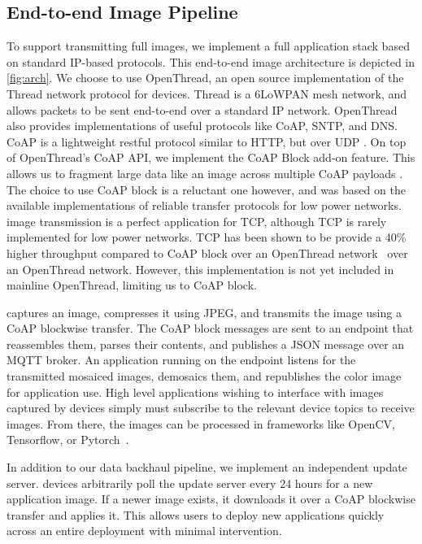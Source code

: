 \subsection{End-to-end Image Pipeline}
To support transmitting full images, we implement a full application stack based on standard IP-based protocols. This end-to-end image architecture is depicted in \cref{fig:arch}.
We choose to use OpenThread, an open source implementation of the Thread network protocol for \namec devices. Thread is a 6LoWPAN mesh network, and allows packets to be sent end-to-end over a standard IP network. OpenThread also provides implementations of useful protocols like CoAP, SNTP, and DNS. 
CoAP is a lightweight restful protocol similar to HTTP, but over UDP \cite{shelby2014constrained}. 
On top of OpenThread's CoAP API, we implement the CoAP Block add-on feature. This allows us to fragment large data like an image across multiple CoAP payloads \cite{bormann2016block}. 
The choice to use CoAP block is a reluctant one however, and was based on the available implementations of reliable transfer protocols for low power networks.
\namec image transmission is a perfect application for TCP, although TCP is rarely implemented for low power networks. TCP has been shown to be provide a 40\% higher throughput compared to CoAP block over an OpenThread network~\cite{kumar2020performant} over an OpenThread network. However, this implementation is not yet included in mainline OpenThread, limiting us to CoAP block.

\namec captures an image, compresses it using JPEG, and transmits the image using a CoAP blockwise transfer. The CoAP block messages are sent to an endpoint that reassembles them, parses their contents, and publishes a JSON message over an MQTT broker. An application running on the endpoint listens for the transmitted mosaiced images, demosaics them, and republishes the color image for application use. High level applications wishing to interface with images captured by \namec devices simply must subscribe to the relevant device topics to receive images. From there, the images can be processed in frameworks like OpenCV, Tensorflow, or Pytorch~\cite{tensorflow2015-whitepaper, pytorch,itseez2015opencv}.

In addition to our data backhaul pipeline, we implement an independent update server. \namec devices arbitrarily poll the update server every 24 hours for a new application image. If a newer image exists, it downloads it over a CoAP blockwise transfer and applies it. This allows users to deploy new applications quickly across an entire deployment with minimal intervention.

